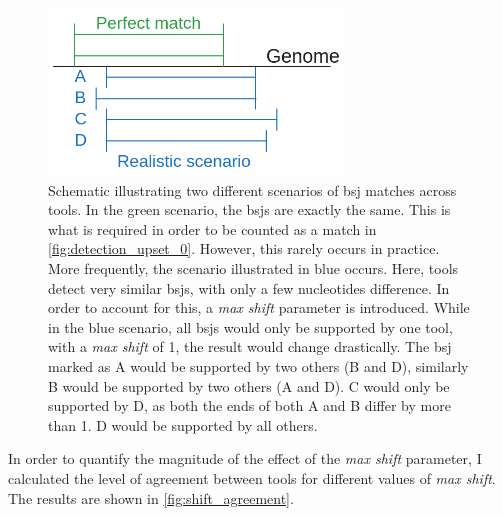 \begin{figure}[H] \centering

    \includegraphics[width=0.7\textwidth]{chapters/4_results_and_discussion/figures/grouping.png}
    \caption{Schematic illustrating two different scenarios of \gls{bsj}
        matches
        across tools.
        In the green scenario, the \glspl{bsj} are exactly the same.
        This is what is required in order to be counted as a match in
        \cref{fig:detection_upset_0}.
        However, this rarely occurs in practice.
        More frequently, the scenario illustrated in blue occurs.
        Here, tools detect very similar \glspl{bsj}, with only a few nucleotides
        difference.
        In order to account for this, a \textit{max shift} parameter is introduced.
        While in the blue scenario, all \glspl{bsj} would only be supported by one
        tool, with a \textit{max shift} of 1, the result would change drastically.
        The \gls{bsj} marked as A would be supported by two others (B and D), similarly
        B would be supported by two others (A and D).
        C would only be supported by D, as both the ends of both A and B differ by more
        than 1.
        D would be supported by all others.
    }
    \label{fig:detection_shift_schematic}
\end{figure}

In order to quantify the magnitude of the effect of the \textit{max shift}
parameter, I calculated the level of agreement between tools for different
values of \textit{max shift}.
The results are shown in \cref{fig:shift_agreement}.


